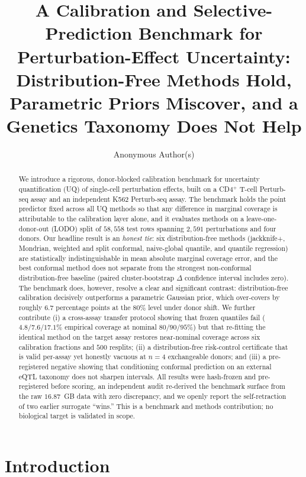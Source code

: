 \documentclass{article}
\title{A Calibration and Selective-Prediction Benchmark for
Perturbation-Effect Uncertainty: Distribution-Free Methods Hold,
Parametric Priors Miscover, and a Genetics Taxonomy Does Not Help}
\author{Anonymous Author(s)}
\affil{Hackathon submission (Datasets \& Benchmarks track)}
\date{}
\begin{document}
\maketitle

\begin{abstract}
We introduce a rigorous, donor-blocked calibration benchmark for
uncertainty quantification (UQ) of single-cell perturbation effects,
built on a CD4$^{+}$ T-cell Perturb-seq assay and an independent K562
Perturb-seq assay. The benchmark holds the point predictor fixed across
all UQ methods so that any difference in marginal coverage is
attributable to the calibration layer alone, and it evaluates methods on
a leave-one-donor-out (LODO) split of $58{,}558$ test rows spanning
$2{,}591$ perturbations and four donors. Our headline result is an
\emph{honest tie}: six distribution-free methods (jackknife$+$, Mondrian,
weighted and split conformal, naive-global quantile, and quantile
regression) are statistically indistinguishable in mean absolute
marginal coverage error, and the best conformal method does not separate
from the strongest non-conformal distribution-free baseline (paired
cluster-bootstrap $\Delta$ confidence interval includes zero). The
benchmark does, however, resolve a clear and significant contrast:
distribution-free calibration decisively outperforms a parametric
Gaussian prior, which over-covers by roughly $6.7$ percentage points at
the $80\%$ level under donor shift. We further contribute (i) a
cross-assay transfer protocol showing that frozen quantiles fail
($4.8/7.6/17.1\%$ empirical coverage at nominal $80/90/95\%$) but that
re-fitting the identical method on the target assay restores near-nominal
coverage across six calibration fractions and $500$ resplits; (ii) a
distribution-free risk-control certificate that is valid per-assay yet
honestly vacuous at $n{=}4$ exchangeable donors; and (iii) a
pre-registered negative showing that conditioning conformal prediction on
an external eQTL taxonomy does not sharpen intervals. All results were
hash-frozen and pre-registered before scoring, an independent audit
re-derived the benchmark surface from the raw $16.87$~GB data with zero
discrepancy, and we openly report the self-retraction of two earlier
surrogate ``wins.'' This is a benchmark and methods contribution; no
biological target is validated in scope.
\end{abstract}

\section{Introduction}
\end{document}
